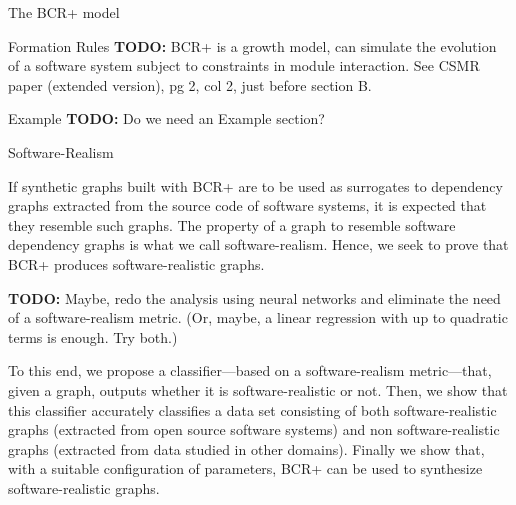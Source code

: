 \documentclass[11pt,twocolumn,a4paper,english]{article}
\newcommand{\TODO}{\textbf{TODO:} }
\begin{document}
\begin{section}{The BCR+ model}
\begin{subsection}{Formation Rules}
	\TODO BCR+ is a growth model, can simulate the evolution of a software system subject to constraints in module interaction. See CSMR paper (extended version), pg 2, col 2, just before section B. 
	
\end{subsection}

\begin{subsection}{Example}
	\TODO Do we need an Example section? %
\end{subsection}
	
\end{section}


\begin{section}{Software-Realism}
	
	If synthetic graphs built with BCR+ are to be used as surrogates to dependency graphs extracted from the source code of software systems, it is expected that they resemble such graphs. The property of a graph to resemble software dependency graphs is what we call software-realism. Hence, we seek to prove that BCR+ produces software-realistic graphs.
	
	\TODO Maybe, redo the analysis using neural networks and eliminate the need of a software-realism metric. (Or, maybe, a linear regression with up to quadratic terms is enough. Try both.)
	
	To this end, we propose a classifier---based on a software-realism metric---that, given a graph, outputs whether it is software-realistic or not. Then, we show that this classifier accurately classifies a data set consisting of both software-realistic graphs (extracted from open source software systems) and non software-realistic graphs (extracted from data studied in other domains). Finally we show that, with a suitable configuration of parameters, BCR+ can be used to synthesize software-realistic graphs.
	
	

\end{section}
\end{document}
